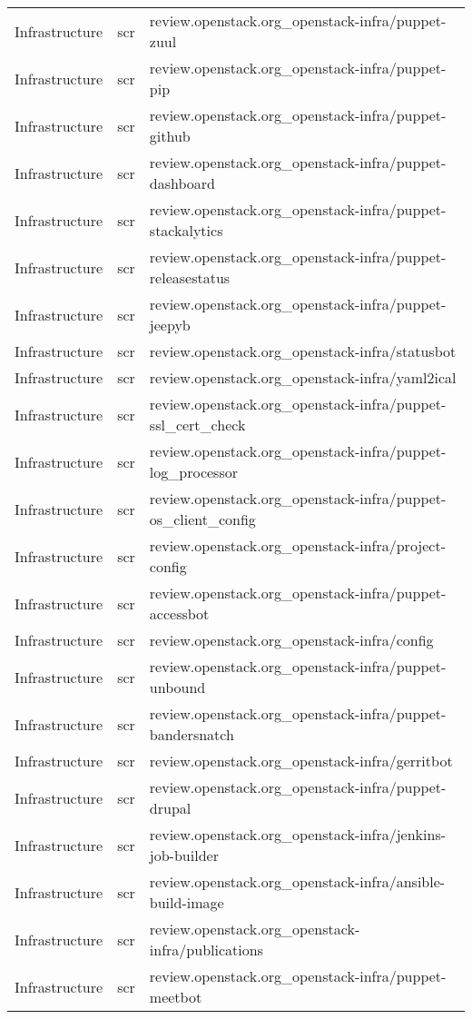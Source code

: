 \begin{center}
\begin{longtable}{|p{4cm}|p{1cm}|p{10cm}|}
Infrastructure&scr&review.openstack.org\_openstack-infra/puppet-zuul\\ 
Infrastructure&scr&review.openstack.org\_openstack-infra/puppet-pip\\ 
Infrastructure&scr&review.openstack.org\_openstack-infra/puppet-github\\ 
Infrastructure&scr&review.openstack.org\_openstack-infra/puppet-dashboard\\ 
Infrastructure&scr&review.openstack.org\_openstack-infra/puppet-stackalytics\\ 
Infrastructure&scr&review.openstack.org\_openstack-infra/puppet-releasestatus\\ 
Infrastructure&scr&review.openstack.org\_openstack-infra/puppet-jeepyb\\ 
Infrastructure&scr&review.openstack.org\_openstack-infra/statusbot\\ 
Infrastructure&scr&review.openstack.org\_openstack-infra/yaml2ical\\ 
Infrastructure&scr&review.openstack.org\_openstack-infra/puppet-ssl\_cert\_check\\ 
Infrastructure&scr&review.openstack.org\_openstack-infra/puppet-log\_processor\\ 
Infrastructure&scr&review.openstack.org\_openstack-infra/puppet-os\_client\_config\\ 
Infrastructure&scr&review.openstack.org\_openstack-infra/project-config\\ 
Infrastructure&scr&review.openstack.org\_openstack-infra/puppet-accessbot\\ 
Infrastructure&scr&review.openstack.org\_openstack-infra/config\\ 
Infrastructure&scr&review.openstack.org\_openstack-infra/puppet-unbound\\ 
Infrastructure&scr&review.openstack.org\_openstack-infra/puppet-bandersnatch\\ 
Infrastructure&scr&review.openstack.org\_openstack-infra/gerritbot\\ 
Infrastructure&scr&review.openstack.org\_openstack-infra/puppet-drupal\\ 
Infrastructure&scr&review.openstack.org\_openstack-infra/jenkins-job-builder\\ 
Infrastructure&scr&review.openstack.org\_openstack-infra/ansible-build-image\\ 
Infrastructure&scr&review.openstack.org\_openstack-infra/publications\\ 
Infrastructure&scr&review.openstack.org\_openstack-infra/puppet-meetbot\\ 

\end{longtable}
\end{center}

